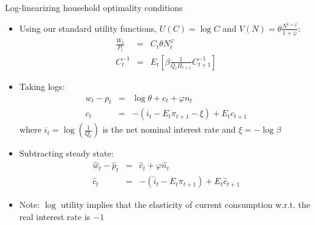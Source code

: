 \documentclass[9pt,xcolor={dvipsnames}]{beamer}
\newcommand{\bit}{\begin{itemize}}
\newcommand{\eit}{\end{itemize}}
\begin{document}
\begin{frame}{Log-linearizing household optimality conditions}

\bit
\setlength\itemsep{1.5em}

\item Using our standard utility functions, $U(C)=\log C$ and $V(N) = \theta \frac{N^{1+\varphi}}{1+\varphi}$:
\begin{eqnarray}
\frac{W_t}{P_t} &=& C_t \theta N_t^{\varphi} \nonumber \\
C_t^{-1} &=& E_t \left[\beta \frac{1}{Q_t \Pi_{t+1}} C^{-1}_{t+1}   \right] \nonumber
\end{eqnarray}

\item Taking logs:
\begin{eqnarray}
w_t -  p_t &=& \log \theta + c_t + \varphi n_t \nonumber \\
c_t &=& - (i_t-E_t \pi_{t+1}-\xi) + E_t c_{t+1} \nonumber
\end{eqnarray}
where $i_t = \log \left(\frac{1}{Q_t}\right)$ is the net nominal interest rate and $\xi = -\log \beta$

\item Subtracting steady state:
\begin{eqnarray}
\hat w_t - \hat p_t &=& \hat c_t + \varphi \hat n_t \nonumber \\
\hat c_t &=& - (\hat i_t-E_t \pi_{t+1}) + E_t \hat c_{t+1} \nonumber
\end{eqnarray}

\item Note: $\log$ utility implies that the elasticity of current consumption w.r.t. the real interest rate is $-1$

\eit

\end{frame}
\end{document}
